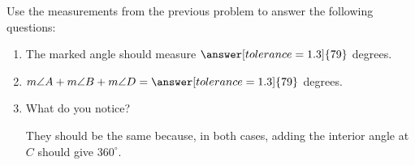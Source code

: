 \documentclass[nooutcomes]{ximera}
\begin{document}
\begin{problem}
Use the measurements from the previous problem to answer the following questions: 

\begin{enumerate}
\item The marked angle should measure $\answer[tolerance=1.3]{79}$ degrees.  
\item $m\angle A + m\angle B + m\angle D = \answer[tolerance=1.3]{79}$ degrees.  
\item What do you notice?  
\begin{freeResponse}
\begin{hint}
They should be the same because, in both cases, adding the interior angle at $C$ should give $360^\circ$.  
\end{hint}
\end{freeResponse}
\end{enumerate}

\end{problem}
\end{document}
